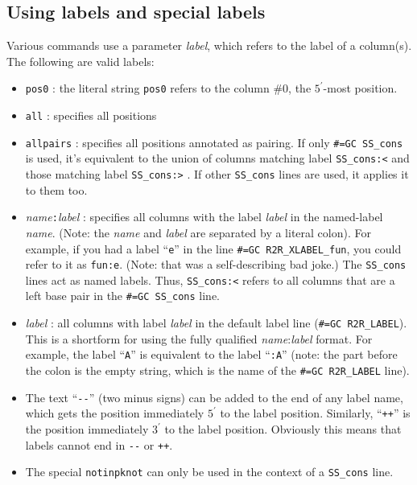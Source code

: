\documentclass[letterpaper,12pt]{report}
\begin{document}
\subsection{Using labels and special labels}
\label{sec:usinglabels}
Various commands use a parameter \textit{label}, which refers to the
label of a column(s).  The following are valid labels:

\begin{itemize}
\item {\tt pos0} : the literal string {\tt pos0} refers to the column \#0, the
$5^{\prime}$-most position.
\item {\tt all}  : specifies all positions
\item {\tt allpairs}  : specifies all positions annotated as pairing. 
If only {\tt \#=GC SS\_cons} is used, it{\textquoteright}s equivalent to the union of columns matching label
{\tt SS\_cons:{\textless}} and those matching label {\tt SS\_cons:{\textgreater}} .  If other {\tt SS\_cons} lines
are used, it applies it to them too.
\item \textit{name}{\tt :}\textit{label} : specifies all columns with the
label \textit{label }in the named-label \textit{name}.  (Note: the {\it name} and {\it label} are
separated by a literal colon).
For example, if you had a label ``{\tt e}'' in the line {\tt \#=GC R2R\_XLABEL\_fun},
you could refer to it as {\tt fun:e}.  (Note: that was a self-describing bad joke.)
The {\tt SS\_cons} lines act as named labels.  Thus, {\tt SS\_cons:\textless} refers to all columns that are a left base pair in the {\tt \#=GC SS\_cons} line.
\item \textit{label} : all columns with label \textit{label} in the
default label line ({\tt \#=GC R2R\_LABEL}).  This is a shortform for using
the fully qualified \textit{name}:\textit{label }format.  For example,
the label {\textquotedblleft}{\tt A}{\textquotedblright} is equivalent to the
label {\textquotedblleft}{\tt :A}{\textquotedblright} (note: the part before
the colon is the empty string, which is the name of the {\tt \#=GC
R2R\_LABEL} line).
\item The text {\textquotedblleft}{\tt {}-{}-}{\textquotedblright} (two minus
signs) can be added to the end of any label name, which gets the
position immediately $5^\prime$ to the label position.  Similarly,
{\textquotedblleft}{\tt ++}{\textquotedblright} is the position immediately
$3^\prime$ to the label position.  Obviously this means that labels
cannot end in {\tt -{}-} or {\tt ++}.
\item The special {\tt notinpknot} can only be used in the context of a {\tt SS\_cons} line.

\end{itemize}
\end{document}
